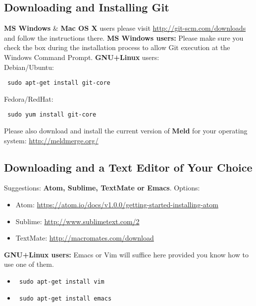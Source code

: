 \documentclass{article}[12pt]
\begin{document}
\subsection*{Downloading and Installing Git}
\textbf{MS Windows} \& \textbf{Mac OS X} users please visit \url{http://git-scm.com/downloads} and follow the instructions there.
\newline
\newline
\textbf{MS Windows users:} Please make sure you check the box during the installation process to allow Git execution at the Windows Command Prompt.
\newline
\newline
\textbf{GNU+Linux} users:\\
Debian/Ubuntu: \begin{verbatim} sudo apt-get install git-core \end{verbatim} 
Fedora/RedHat: \begin{verbatim} sudo yum install git-core \end{verbatim}

Please also download and install the current version of \textbf{Meld} for your operating system: \url{http://meldmerge.org/}

\subsection*{Downloading and a Text Editor of Your Choice}
Suggestions: \textbf{Atom, Sublime, TextMate or Emacs}.
Options: \begin{itemize}
\item Atom: \url{https://atom.io/docs/v1.0.0/getting-started-installing-atom}
\item Sublime: \url{http://www.sublimetext.com/2}
\item TextMate: \url{http://macromates.com/download}
\end{itemize}

\textbf{GNU+Linux users:} Emacs or Vim will suffice here provided you know how to use one of them.
\begin{itemize}
\item \begin{verbatim} sudo apt-get install vim \end{verbatim} 
\item \begin{verbatim} sudo apt-get install emacs \end{verbatim} 
\end{itemize}
\end{document}
